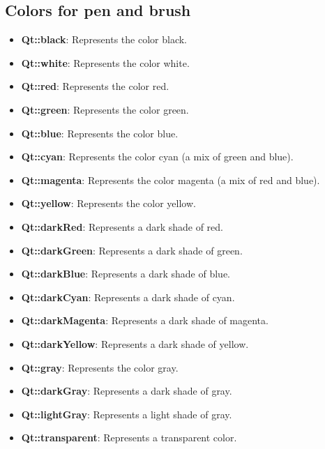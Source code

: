 \documentclass{report}
\begin{document}
    \bigbreak \noindent 
    \subsection{Colors for pen and brush}
    \begin{itemize}
        \item \textbf{Qt::black}: Represents the color black.
        \item \textbf{Qt::white}: Represents the color white.
        \item \textbf{Qt::red}: Represents the color red.
        \item \textbf{Qt::green}: Represents the color green.
        \item \textbf{Qt::blue}: Represents the color blue.
        \item \textbf{Qt::cyan}: Represents the color cyan (a mix of green and blue).
        \item \textbf{Qt::magenta}: Represents the color magenta (a mix of red and blue).
        \item \textbf{Qt::yellow}: Represents the color yellow.
        \item \textbf{Qt::darkRed}: Represents a dark shade of red.
        \item \textbf{Qt::darkGreen}: Represents a dark shade of green.
        \item \textbf{Qt::darkBlue}: Represents a dark shade of blue.
        \item \textbf{Qt::darkCyan}: Represents a dark shade of cyan.
        \item \textbf{Qt::darkMagenta}: Represents a dark shade of magenta.
        \item \textbf{Qt::darkYellow}: Represents a dark shade of yellow.
        \item \textbf{Qt::gray}: Represents the color gray.
        \item \textbf{Qt::darkGray}: Represents a dark shade of gray.
        \item \textbf{Qt::lightGray}: Represents a light shade of gray.
        \item \textbf{Qt::transparent}: Represents a transparent color.
    \end{itemize}

    \pagebreak
\end{document}
